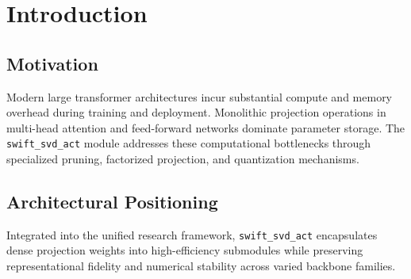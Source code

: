 \section{Introduction}

\subsection{Motivation}
Modern large transformer architectures incur substantial compute and memory overhead during training and deployment. Monolithic projection operations in multi-head attention and feed-forward networks dominate parameter storage. The \texttt{swift_svd_act} module addresses these computational bottlenecks through specialized pruning, factorized projection, and quantization mechanisms.

\subsection{Architectural Positioning}
Integrated into the unified research framework, \texttt{swift_svd_act} encapsulates dense projection weights into high-efficiency submodules while preserving representational fidelity and numerical stability across varied backbone families.
